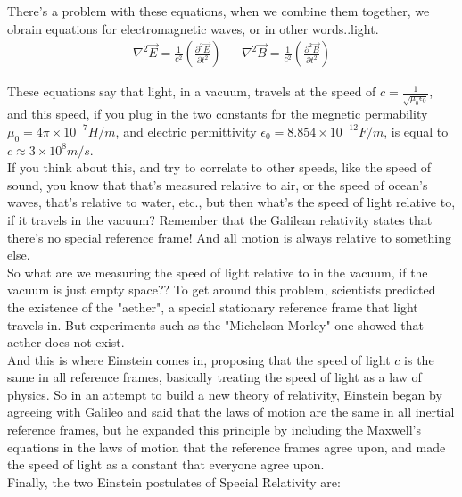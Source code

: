 There's a problem with these equations, when we combine them together, we obrain
equations for electromagnetic waves, or in other words..light.\\

\begin{align*}
    \nabla^2\vec{E} = \frac{1}{c^2}\left(\frac{\partial^2 \vec{E}}{\partial t^2}\right)&&
    \nabla^2\vec{B} = \frac{1}{c^2}\left(\frac{\partial^2 \vec{B}}{\partial t^2}\right)
\end{align*}

These equations say that light, in a vacuum, travels at the speed of $c = \frac{1}{\sqrt{\mu_0 \epsilon_0}}$, and this 
speed, if you plug in the two constants for the megnetic permability $\mu_0 = 4\pi \times 10^{-7} H/m$, and electric permittivity $\epsilon_0 = 8.854 \times 10^{-12} F/m$, is equal to
$c \approx 3 \times 10^8 m/s$.\\

If you think about this, and try to correlate to other speeds, like the speed of sound, you know that that's measured relative to air, or the speed of 
ocean's waves, that's relative to water, etc., but then what's the speed of light relative to, if it travels in the vacuum?
Remember that the Galilean relativity states that there's no special reference frame! And all motion is always relative to something else.\\

So what are we measuring the speed of light relative to in the vacuum, if the vacuum is just empty space??
To get around this problem, scientists predicted the existence of the "aether", a special stationary reference frame that light travels in.
But experiments such as the "Michelson-Morley" one showed that aether does not exist.\\

And this is where Einstein comes in, proposing that the speed of light $c$ is the same in all reference frames, basically 
treating the speed of light as a law of physics.
So in an attempt to build a new theory of relativity, Einstein began by agreeing with Galileo and said that the laws of motion are the 
same in all inertial reference frames, but he expanded this principle by including the Maxwell's equations in the laws of motion that the reference frames 
agree upon, and made the speed of light as a constant that everyone agree upon.\\

Finally, the two Einstein postulates of Special Relativity are:

